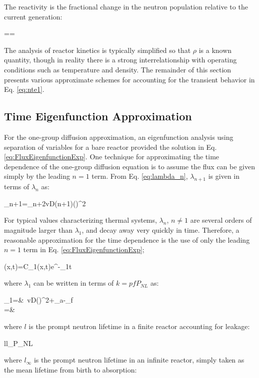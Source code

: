 The reactivity is the fractional change in the neutron population relative to the current generation:

\beq
\label{eq:ReactivityDef}
\rho==
\eeq

The analysis of reactor kinetics is typically simplified so that \(\rho\) is a known quantity, though in reality there is a strong interrelationship with operating conditions such as temperature and density. The remainder of this section presents various approximate schemes for accounting for the transient behavior in Eq. \eqref{eq:nte1}.

\subsection{Time Eigenfunction Approximation}

For the one-group diffusion approximation, an eigenfunction analysis using separation of variables for a bare reactor provided the solution in Eq. \eqref{eq:FluxEigenfunctionExp}. One technique for approximating the time dependence of the one-group diffusion equation is to assume the flux can be given simply by the leading \(n=1\) term. From Eq. \eqref{eq:lambda_n}, \(\lambda_{n+1}\) is given in terms of \(\lambda_n\) as:

\beq
\lambda_{n+1}=\lambda_n+2vD(n+1)\left(\right)^2
\eeq

For typical values characterizing thermal systems, \(\lambda_{n}\), \(n\neq1\) are several orders of magnitude larger than \(\lambda_1\), and decay away very quickly in time. Therefore, a reasonable approximation for the time dependence is the use of only the leading \(n=1\) term in Eq. \eqref{eq:FluxEigenfunctionExp};

\beq
\phi(x,t)=C_1(x,t)e^{-\lambda_1t}
\eeq

where \(\lambda_1\) can be written in terms of \(k=pfP_{NL}\) as:

\beqa
\lambda_1=&\ v\left\lbrack D\left(\right)^2+\Sigma_a-\nu\Sigma_f\right\rbrack\\
=&\ 
\eeqa

where \(l\) is the prompt neutron lifetime in a finite reactor accounting for leakage:

\beq
l\equiv l_\infty P_{NL}
\eeq

where \(l_\infty\) is the prompt neutron lifetime in an infinite reactor, simply taken as the mean lifetime from birth to absorption:

